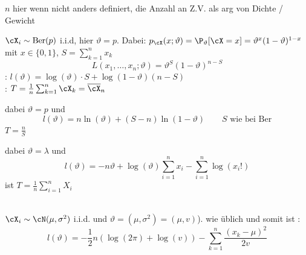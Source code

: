 


{\scriptsize $n$ hier wenn nicht anders definiert, die Anzahl an Z.V. als arg von Dichte / Gewicht}

 $\cX_i \sim \text{Ber}(p)$ i.i.d, hier $\vartheta = p$. Dabei:
$p_\cX(x; \vartheta) = \P_\vartheta[\cX = x] = \vartheta^x (1 - \vartheta)^{1 - x}$ mit $x \in \{0, 1\}$, $S = \sum_{k = 1}^{n}x_k$
\[
    L(x_1, \ldots, x_n; \vartheta) = \vartheta^{S} (1 - \vartheta)^{n - S}
\]
: $l(\vartheta) = \log(\vartheta) \cdot S + \log(1 - \vartheta) \left( n - S \right)$\\
: $T = \frac{1}{n} \sum_{k = 1}^{n} \cX_k = \overline{\cX}_n$


 dabei $\vartheta = p$ und 
\[
    l(\vartheta) = n \ln(\vartheta) + (S - n) \ln(1 - \vartheta) \qquad S \text{ wie bei Ber}
\]
 $T = \frac{n}{S}$


 dabei $\vartheta = \lambda$ und 
\[
    l(\vartheta) = -n \vartheta + \log(\vartheta) \sum_{i = 1}^{n} x_i - \sum_{i = 1}^{n} \log(x_i!)
\]
 ist $T = \frac{1}{n} \sum_{i = 1}^{n} X_i$

\\
$\cX_i \sim \cN(\mu, \sigma^2)$ i.i.d. und $\vartheta = (\mu, \sigma^2) = (\mu, v)$).  wie üblich und somit ist :
\[
    l(\vartheta) = -\frac{1}{2} n(\log(2 \pi) + \log(v)) - \sum_{k = 1}^{n} \frac{(x_k - \mu)^2}{2v}
\]


